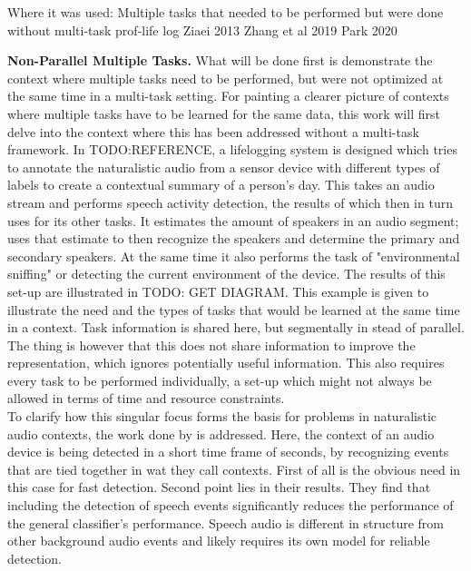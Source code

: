 Where it was used:
Multiple tasks that needed to be performed but were done without multi-task
prof-life log Ziaei 2013
Zhang et al 2019
Park 2020



\textbf{Non-Parallel Multiple Tasks.} What will be done first is demonstrate the context where multiple tasks need to be performed, but were not optimized at the same time in a multi-task setting. For painting a clearer picture of contexts where multiple tasks have to be learned for the same data, this work will first delve into the context where this has been addressed without a multi-task framework. In TODO:REFERENCE, a lifelogging system is designed which tries to annotate the naturalistic audio from a sensor device with different types of labels to create a contextual summary of a person's day. This takes an audio stream and performs speech activity detection, the results of which then in turn uses for its other tasks. It estimates the amount of speakers in an audio segment; uses that estimate to then recognize the speakers and determine the primary and secondary speakers. At the same time it also performs the task of "environmental sniffing" or detecting the current environment of the device. The results of this set-up are illustrated in TODO: GET DIAGRAM. This example is given to illustrate the need and the types of tasks that would be learned at the same time in a context. Task information is shared here, but segmentally in stead of parallel. The thing is however that this does not share information to improve the representation, which ignores potentially useful information. This also requires every task to be performed individually, a set-up which might not always be allowed in terms of time and resource constraints.\\

To clarify how this singular focus forms the basis for problems in naturalistic audio contexts, the work done by \cite{park2020augmenting} is addressed. Here, the context of an audio device is being detected in a short time frame of seconds, by recognizing events that are tied together in wat they call contexts. First of all is the obvious need in this case for fast detection. Second point lies in their results. They find that including the detection of speech events significantly reduces the performance of the general classifier's performance. Speech audio is different in structure from other background audio events and likely requires its own model for reliable detection.\\

